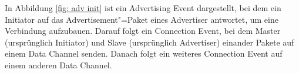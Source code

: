 In Abbildung \ref{fig: adv init} ist ein Advertising Event dargestellt, bei dem ein Initiator auf das Advertisement"=Paket eines Advertiser antwortet, um eine Verbindung aufzubauen. Darauf folgt ein Connection Event, bei dem Master (ursprünglich Initiator) und Slave (ursprünglich Advertiser) einander Pakete auf einem Data Channel senden. Danach folgt ein weiteres Connection Event auf einem anderen Data Channel.